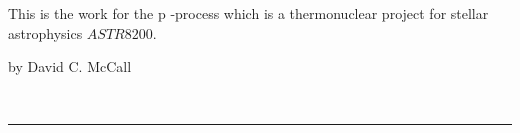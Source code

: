 \documentclass{article}
\newcounter{counter}
\newcounter{table_counter}
\begin{document}
This is the work for the p -process which is a thermonuclear project for stellar astrophysics $ASTR 8200$. 

\begin{center}
by David C. McCall
\end{center}















\ \hrule
\end{document}
